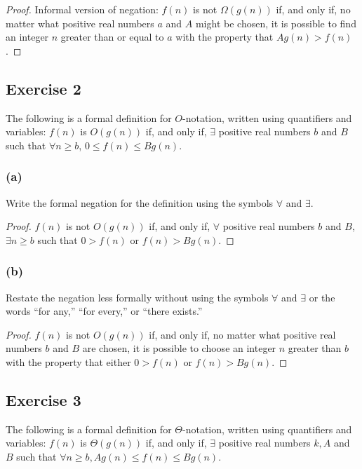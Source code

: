 \documentclass[14pt]{extarticle}
\newcommand{\fa}{\forall}
\newcommand{\te}{\exists}
\begin{document}
\begin{proof}
    Informal version of negation: \(f(n)\) is not \(\Omega(g(n))\) if, and only if, no matter what positive real numbers \(a\)
    and \(A\) might be chosen, it is possible to find an integer \(n\) greater than or equal to \(a\) with the property that
    \(Ag(n) > f(n)\).
\end{proof}

\subsection{Exercise 2}
The following is a formal definition for \(O\)-notation, written using quantifiers and variables: \(f(n)\) is
\(O(g(n))\) if, and only if, \(\te\) positive real numbers \(b\) and \(B\) such that \(\fa n \geq b\),
\(0 \leq f(n) \leq Bg(n)\).

\subsubsection{(a)}
Write the formal negation for the definition using the symbols \(\fa\) and \(\te\).

\begin{proof}
    \(f(n)\) is not \(O(g(n))\) if, and only if, \(\fa\) positive real numbers \(b\) and \(B\), \(\te n \geq b\) such that
    \(0 > f(n)\) or \(f(n) > Bg(n)\).
\end{proof}

\subsubsection{(b)}
Restate the negation less formally without using the symbols \(\fa\) and \(\te\) or the words “for any,” “for every,” or
“there exists.”

\begin{proof}
    \(f(n)\) is not \(O(g(n))\) if, and only if, no matter what positive real numbers \(b\) and \(B\) are chosen, it is
    possible to choose an integer \(n\) greater than \(b\) with the property that either \(0 > f(n)\) or \(f(n) > Bg(n)\).
\end{proof}

\subsection{Exercise 3}
The following is a formal definition for \(\Theta\)-notation, written using quantifiers and variables: \(f(n)\) is \(\Theta
(g(n))\) if, and only if, \(\te\) positive real numbers \(k, A\) and \(B\) such that \(\fa n \geq b, Ag(n) \leq f(n) \leq
Bg(n)\).
\end{document}
